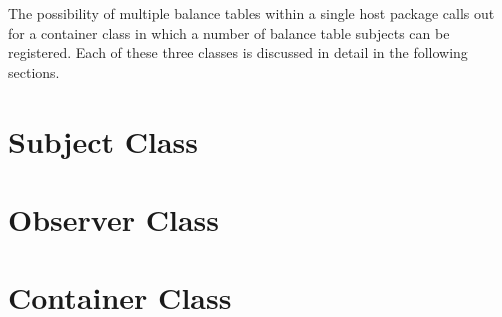 \documentclass[reqno]{lanl}
\begin{document}
The possibility of multiple balance tables within a single host package
calls out for a container class in which a number of balance table
subjects can be registered. Each of these three classes is discussed
in detail in the following sections.

\section*{Subject Class}
\section*{Observer Class}
\section*{Container Class}





\end{document}
